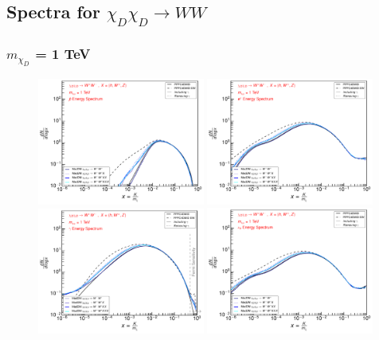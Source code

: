 \documentclass[epj,nopacs,fleqn]{svjour}
\begin{document}
\clearpage
\subsection{Spectra for $\chi_D \chi_D \rightarrow WW$}
\subsubsection{$m_{\chi_D}$ = 1 TeV}
\begin{figure}[!b]
\centering
\subfigure
{ \includegraphics[width=0.49\textwidth]{Fig/1TeV/1_antiprotons_PPPC_Comparison_xdxd_fotone_1.pdf}}
\subfigure
{\includegraphics[width=0.49\textwidth]{Fig/1TeV/1_positrons_PPPC_Comparison_xdxd_fotone_1.pdf}}
\subfigure
{\includegraphics[width=0.49\textwidth]{Fig/1TeV/1_gammas_PPPC_Comparison_xdxd_fotone_1.pdf}}
\subfigure
{\includegraphics[width=0.49\textwidth]{Fig/1TeV/1_neutrinos_e_PPPC_Comparison_xdxd_fotone_1.pdf}}

\end{figure}
\end{document}
